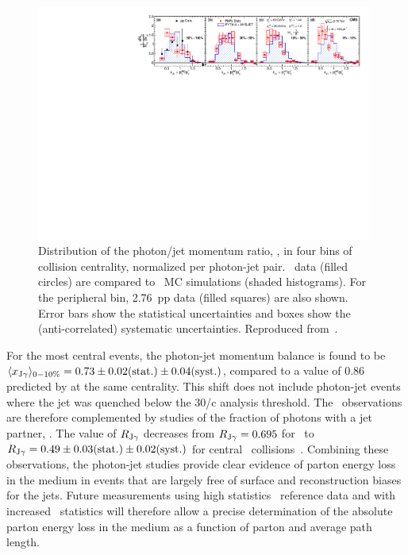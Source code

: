 \begin{figure}[!ht]
\begin{center}
\includegraphics[width=0.98\textwidth]{jetfigures/Photonv7_Paper_InclPtRatio_all_cent4_G60J30_subDPhi1SS1_Isol0_Norm1log1.pdf}
\caption[]{\label{fig:GR:InclPtRatio_qcdPhoRef_pp2760-xJ30G60} Distribution of the photon/jet
momentum ratio, \xjg, in four bins of collision centrality, normalized per
photon-jet pair. \PbPb\ data (filled circles) are compared to \PYTHYD\ MC simulations
(shaded histograms). For the peripheral bin,  2.76\TeV\ pp data (filled squares)
are also shown.  Error bars show the statistical uncertainties and
boxes show the (anti-correlated) systematic uncertainties. Reproduced from~\cite{Chatrchyan:2012gt}.}
\label{fig:GR:CMS_xjg}
\end{center}
\end{figure}

For the most central events, the  photon-jet momentum balance  is found to be
$\langle x_{\mathrm{J}\gamma}\rangle_{0-10\%} = 0.73 \pm 0.02 \mbox{(stat.)} \pm 0.04 \mbox{(syst.)}$, compared
to a value of 0.86 predicted by \PYTHYD{} at the same centrality. This shift does
not include photon-jet events where the jet was quenched below the 30\GeV/c analysis threshold.
The \xjg\ observations are therefore complemented by studies of the fraction of
photons with a jet partner, \rjg.  The value of $R_{\mathrm{J}\gamma}$ decreases
from $R_{\mathrm{J}\gamma} = 0.695$ for \PYTHYD\
to  $R_{\mathrm{J}\gamma} = 0.49\pm 0.03\mbox{(stat.)}\pm 0.02\mbox{(syst.)}$ for
central \PbPb\ collisions~\cite{Chatrchyan:2012gt}. Combining these observations, the photon-jet studies
provide clear evidence of parton energy loss in the medium in events that are
largely free of surface and reconstruction biases for the jets. Future measurements
using high statistics \pp\ reference data and with increased \PbPb\ statistics will
therefore allow a precise determination of the absolute parton energy loss
in the medium as a function of parton \pT and average path length.

